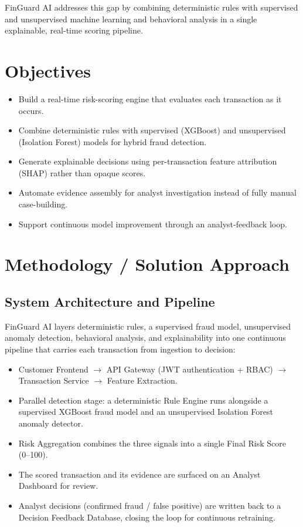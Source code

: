 \documentclass[11pt,letterpaper]{article}
\begin{document}
FinGuard AI addresses this gap by combining deterministic rules with supervised and unsupervised machine learning and behavioral analysis in a single explainable, real-time scoring pipeline.

\section{Objectives}
\begin{itemize}
    \item Build a real-time risk-scoring engine that evaluates each transaction as it occurs.
    \item Combine deterministic rules with supervised (XGBoost) and unsupervised (Isolation Forest) models for hybrid fraud detection.
    \item Generate explainable decisions using per-transaction feature attribution (SHAP) rather than opaque scores.
    \item Automate evidence assembly for analyst investigation instead of fully manual case-building.
    \item Support continuous model improvement through an analyst-feedback loop.
\end{itemize}

\newpage
\section{Methodology / Solution Approach}

\subsection{System Architecture and Pipeline}
FinGuard AI layers deterministic rules, a supervised fraud model, unsupervised anomaly detection, behavioral analysis, and explainability into one continuous pipeline that carries each transaction from ingestion to decision:
\begin{itemize}
    \item Customer Frontend $\rightarrow$ API Gateway (JWT authentication + RBAC) $\rightarrow$ Transaction Service $\rightarrow$ Feature Extraction.
    \item Parallel detection stage: a deterministic Rule Engine runs alongside a supervised XGBoost fraud model and an unsupervised Isolation Forest anomaly detector.
    \item Risk Aggregation combines the three signals into a single Final Risk Score (0--100).
    \item The scored transaction and its evidence are surfaced on an Analyst Dashboard for review.
    \item Analyst decisions (confirmed fraud / false positive) are written back to a Decision Feedback Database, closing the loop for continuous retraining.
\end{itemize}
\end{document}
